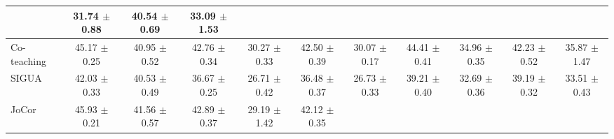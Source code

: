 \documentclass[11pt]{article}
\begin{document}
\begin{table}[!htbp]
\begin{tabular}{l |cc|cc|cc|cc|cc}
			& \makecell{31.74\\ $\pm$\scriptsize{0.88}}
			& \makecell{40.54\\ $\pm$\scriptsize{0.69}}
			& \makecell{33.09\\ $\pm$\scriptsize{1.53}}\\
			\hline
			Co-teaching & \makecell{45.17\\ $\pm$\scriptsize{0.25}}
			&\makecell{40.95\\ $\pm$\scriptsize{0.52}}
			&\makecell{42.76\\ $\pm$\scriptsize{0.34}}
			&\makecell{30.27\\ $\pm$\scriptsize{0.33}}
			&\makecell{42.50\\ $\pm$\scriptsize{0.39}}
			&\makecell{30.07\\ $\pm$\scriptsize{0.17}}
			&\makecell{44.41\\ $\pm$\scriptsize{0.41}}
			&\makecell{34.96\\ $\pm$\scriptsize{0.35}}
			&\makecell{42.23\\ $\pm$\scriptsize{0.52}}
			&\makecell{35.87\\ $\pm$\scriptsize{1.47}}\\
			\hline	
			SIGUA & \makecell{42.03\\ $\pm$\scriptsize{0.33}}
			& \makecell{40.53\\ $\pm$\scriptsize{0.49}}
			& \makecell{36.67\\ $\pm$\scriptsize{0.25}}
			& \makecell{26.71\\ $\pm$\scriptsize{0.42}}
			& \makecell{36.48\\ $\pm$\scriptsize{0.37}}
			& \makecell{26.73\\ $\pm$\scriptsize{0.33}}
			& \makecell{39.21\\ $\pm$\scriptsize{0.40}}
			& \makecell{32.69\\ $\pm$\scriptsize{0.36}}
			& \makecell{39.19\\ $\pm$\scriptsize{0.32}}
			& \makecell{33.51\\ $\pm$\scriptsize{0.43}}\\\hline
			JoCor& \makecell{45.93\\ $\pm$\scriptsize{0.21}} 
			& \makecell{41.56\\ $\pm$\scriptsize{0.57}}
			& \makecell{42.89\\ $\pm$\scriptsize{0.37}}
			& \makecell{29.19\\ $\pm$\scriptsize{1.42}}
			& \makecell{42.12\\ $\pm$\scriptsize{0.35}}

\end{tabular}
\end{table}
\end{document}
